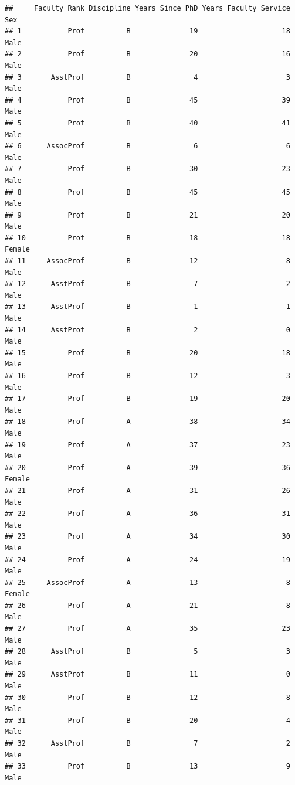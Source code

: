 \documentclass[]{article}
\begin{document}
\begin{verbatim}
##     Faculty_Rank Discipline Years_Since_PhD Years_Faculty_Service    Sex
## 1           Prof          B              19                    18   Male
## 2           Prof          B              20                    16   Male
## 3       AsstProf          B               4                     3   Male
## 4           Prof          B              45                    39   Male
## 5           Prof          B              40                    41   Male
## 6      AssocProf          B               6                     6   Male
## 7           Prof          B              30                    23   Male
## 8           Prof          B              45                    45   Male
## 9           Prof          B              21                    20   Male
## 10          Prof          B              18                    18 Female
## 11     AssocProf          B              12                     8   Male
## 12      AsstProf          B               7                     2   Male
## 13      AsstProf          B               1                     1   Male
## 14      AsstProf          B               2                     0   Male
## 15          Prof          B              20                    18   Male
## 16          Prof          B              12                     3   Male
## 17          Prof          B              19                    20   Male
## 18          Prof          A              38                    34   Male
## 19          Prof          A              37                    23   Male
## 20          Prof          A              39                    36 Female
## 21          Prof          A              31                    26   Male
## 22          Prof          A              36                    31   Male
## 23          Prof          A              34                    30   Male
## 24          Prof          A              24                    19   Male
## 25     AssocProf          A              13                     8 Female
## 26          Prof          A              21                     8   Male
## 27          Prof          A              35                    23   Male
## 28      AsstProf          B               5                     3   Male
## 29      AsstProf          B              11                     0   Male
## 30          Prof          B              12                     8   Male
## 31          Prof          B              20                     4   Male
## 32      AsstProf          B               7                     2   Male
## 33          Prof          B              13                     9   Male

\end{verbatim}
\end{document}
